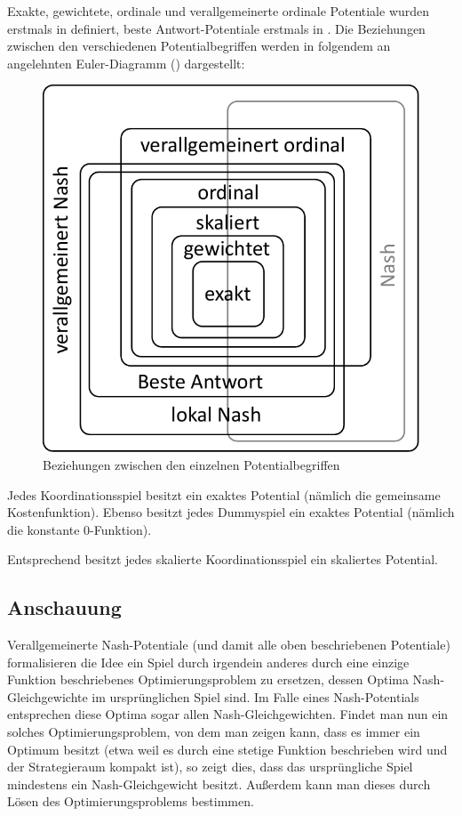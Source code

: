Exakte, gewichtete, ordinale und verallgemeinerte ordinale Potentiale wurden erstmals in \cite{MonShap} definiert, beste Antwort-Potentiale erstmals in \cite{BestRespPot}. Die Beziehungen zwischen den verschiedenen Potentialbegriffen werden in folgendem an \cite{BestRespPot} angelehnten Euler-Diagramm () dargestellt:

\begin{figure}[h]\centering
	\includegraphics[width=.4\textwidth]{../Bilder/EulerDiagPotentiale.pdf}
	\caption{Beziehungen zwischen den einzelnen Potentialbegriffen}\label{diag:Potentiale}
\end{figure}



\begin{bsp}
	Jedes Koordinationsspiel besitzt ein exaktes Potential (nämlich die gemeinsame Kostenfunktion). Ebenso besitzt jedes Dummyspiel ein exaktes Potential (nämlich die konstante $0$-Funktion).
	
	Entsprechend besitzt jedes skalierte Koordinationsspiel ein skaliertes Potential.
\end{bsp}

\subsection{Anschauung}

Verallgemeinerte Nash-Potentiale (und damit alle oben beschriebenen Potentiale) formalisieren die Idee ein Spiel durch irgendein anderes durch eine einzige Funktion beschriebenes Optimierungsproblem zu ersetzen, dessen Optima Nash-Gleichgewichte im ursprünglichen Spiel sind. Im Falle eines Nash-Potentials entsprechen diese Optima sogar allen Nash-Gleichgewichten. Findet man nun ein solches Optimierungsproblem, von dem man zeigen kann, dass es immer ein Optimum besitzt (etwa weil es durch eine stetige Funktion beschrieben wird und der Strategieraum kompakt ist), so zeigt dies, dass das ursprüngliche Spiel mindestens ein Nash-Gleichgewicht besitzt. Außerdem kann man dieses durch Lösen des Optimierungsproblems bestimmen.

